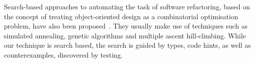 \documentclass[sigconf]{acmart}
\begin{document}
Search-based approaches to automating the task of software refactoring,
based on the concept of treating object-oriented design as a combinatorial
optimisation problem, have also been proposed~\cite{search1,search2}.  They
usually make use of techniques such as simulated annealing, genetic
algorithms and multiple ascent hill-climbing.
%
%
While our technique is search based, the search is guided by types, code
hints, as well as counterexamples, discovered by testing.
\end{document}
